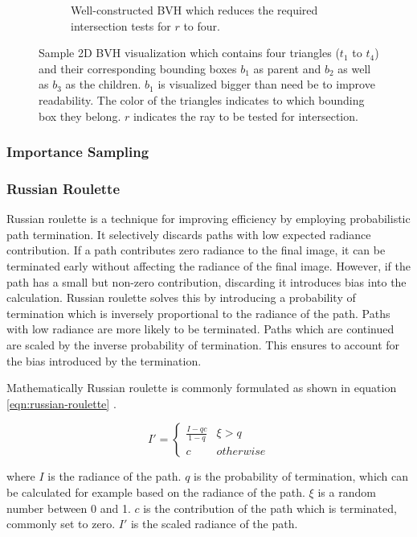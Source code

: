\begin{figure}[H]
\begin{subfigure}[b]{0.45\textwidth}
    \caption{Well-constructed \gls{BVH} which reduces the required intersection tests for $r$ to four.}
    \label{fig:bvhGood}
  \end{subfigure}
  \caption{Sample 2D \gls{BVH} visualization which contains four triangles ($t_1$ to $t_4$) and their corresponding bounding boxes $b_1$ as parent and $b_2$ as well as $b_3$ as the children. $b_1$ is visualized bigger than need be to improve readability. The color of the triangles indicates to which bounding box they belong. $r$ indicates the ray to be tested for intersection.}
  \label{fig:bvhVisualized}
\end{figure}

\subsubsection{Importance Sampling}

\subsubsection{Russian Roulette}

Russian roulette is a technique for improving efficiency by employing probabilistic path termination. It selectively discards paths with low expected radiance contribution. If a path contributes zero radiance to the final image, it can be terminated early without affecting the radiance of the final image. However, if the path has a small but non-zero contribution, discarding it introduces bias into the calculation. Russian roulette solves this by introducing a probability of termination which is inversely proportional to the radiance of the path. Paths with low radiance are more likely to be terminated. Paths which are continued are scaled by the inverse probability of termination. This ensures to account for the bias introduced by the termination.

Mathematically Russian roulette is commonly formulated as shown in equation \ref{eqn:russian-roulette} \cite{Pharr_Physically_Based_Rendering_2023}.

\begin{equation}
  \label{eqn:russian-roulette}
  I' = \begin{cases} \frac{I-qc}{1-q} & \xi > q \\ c & otherwise \end{cases}
\end{equation}
  
where $I$ is the radiance of the path. $q$ is the probability of termination, which can be calculated for example based on the radiance of the path. $\xi$ is a random number between 0 and 1. $c$ is the contribution of the path which is terminated, commonly set to zero. $I'$ is the scaled radiance of the path.

